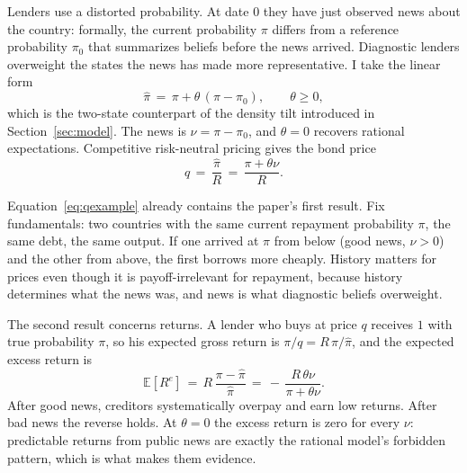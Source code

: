 \documentclass[11pt]{article}
\theoremstyle{definition}
\newcommand{\E}{\mathbb{E}}
\begin{document}
Lenders use a distorted probability. At date $0$ they have just observed news about the country: formally, the current probability $\pi$ differs from a reference probability $\pi_0$ that summarizes beliefs before the news arrived. Diagnostic lenders overweight the states the news has made more representative. I take the linear form
\begin{equation}
\hat\pi \,=\, \pi + \theta\,(\pi - \pi_0), \qquad \theta \geq 0,
\label{eq:pihat}
\end{equation}
which is the two-state counterpart of the density tilt introduced in Section~\ref{sec:model}. The news is $\nu = \pi - \pi_0$, and $\theta = 0$ recovers rational expectations. Competitive risk-neutral pricing gives the bond price
\begin{equation}
q \,=\, \frac{\hat\pi}{R} \,=\, \frac{\pi + \theta \nu}{R}.
\label{eq:qexample}
\end{equation}

Equation~\eqref{eq:qexample} already contains the paper's first result. Fix fundamentals: two countries with the same current repayment probability $\pi$, the same debt, the same output. If one arrived at $\pi$ from below (good news, $\nu > 0$) and the other from above, the first borrows more cheaply. History matters for prices even though it is payoff-irrelevant for repayment, because history determines what the news was, and news is what diagnostic beliefs overweight.

The second result concerns returns. A lender who buys at price $q$ receives $1$ with true probability $\pi$, so his expected gross return is $\pi/q = R\,\pi/\hat\pi$, and the expected excess return is
\begin{equation}
\E\!\left[R^e\right] \,=\, R\,\frac{\pi - \hat\pi}{\hat\pi} \,=\, -\,\frac{R\,\theta\nu}{\pi + \theta\nu}.
\label{eq:returns-example}
\end{equation}
After good news, creditors systematically overpay and earn low returns. After bad news the reverse holds. At $\theta = 0$ the excess return is zero for every $\nu$: predictable returns from public news are exactly the rational model's forbidden pattern, which is what makes them evidence.
\end{document}
